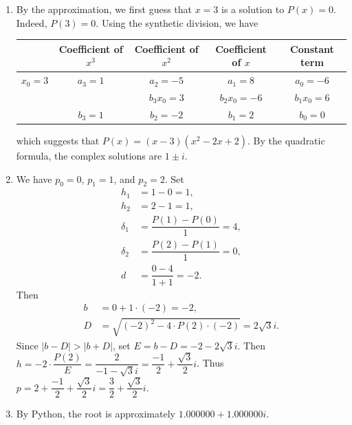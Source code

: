\documentclass[11pt]{article}
\theoremstyle{break}
\numberwithin{equation}{theorem}
\begin{document}
\begin{enumerate}
\begin{center}
    \end{center}
    \item By the approximation, we first guess that $x=3$ is a solution to $P(x)=0$. Indeed, $P(3)=0$. Using the synthetic division, we have
    \begin{center}
        \begin{tabular}{|c|c|c|c|c|}
            \hline
            & Coefficient of $x^3$ & Coefficient of $x^2$ & Coefficient of $x$ & Constant term \\
            \hline
            $x_0=3$ & $a_3=1$ & $a_2=-5$ & $a_1=8$ & $a_0=-6$\\
            \hline
            &  & $b_3x_0=3$ & $b_2x_0=-6$ & $b_1x_0=6$\\
            \hline
            & $b_3=1$ & $b_2=-2$ & $b_1=2$ & $b_0=0$\\
            \hline
        \end{tabular}
    \end{center}
    which suggests that $P(x)=(x-3)(x^2-2x+2)$. By the quadratic formula, the complex solutions are $1\pm i$.
    \item We have $p_0=0$, $p_1=1$, and $p_2=2$. Set
    \begin{align*}
        h_1&=1-0=1,\\
        h_2&=2-1=1,\\
        \delta_1&=\dfrac{P(1)-P(0)}{1}=4,\\
        \delta_2&=\dfrac{P(2)-P(1)}{1}=0,\\
        d&=\dfrac{0-4}{1+1}=-2.
    \end{align*}
    Then
    \begin{align*}
        b&=0+1\cdot(-2)=-2,\\
        D&=\sqrt{(-2)^2-4\cdot P(2)\cdot(-2)}=2\sqrt{3}i.
    \end{align*}
    Since $|b-D|>|b+D|$, set $E=b-D=-2-2\sqrt{3}i$. Then $h=-2\cdot\dfrac{P(2)}{E}=\dfrac{2}{-1-\sqrt{3}i}=\dfrac{-1}{2}+\dfrac{\sqrt{3}}{2}i$. Thus $p=2+\dfrac{-1}{2}+\dfrac{\sqrt{3}}{2}i=\dfrac{3}{2}+\dfrac{\sqrt{3}}{2}i$.
    \item By Python, the root is approximately $1.000000+1.000000i$.
    \begin{center}

\end{center}
\end{enumerate}
\end{document}
